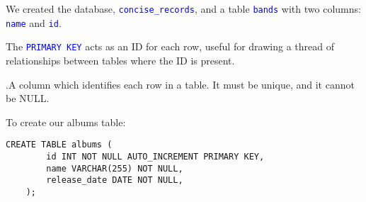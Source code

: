 \vspace{1em}
\noindent
We created the database, \textcolor{blue}{\texttt{concise\_records}}, and a table \textcolor{blue}{\texttt{bands}}
with two columns: \textcolor{blue}{\texttt{name}} and \textcolor{blue}{\texttt{id}}.\\


\newpage

\noindent
The \textcolor{blue}{\texttt{PRIMARY KEY}} acts as an ID for each row, useful for
drawing a thread of relationships between tables where the ID is present.\\

\begin{Def}
    .A column which identifies each row in a table. It must be unique, and it cannot be NULL.
\end{Def}

\noindent
To create our albums table:

\begin{lstlisting}[style=sql]
    CREATE TABLE albums (
        id INT NOT NULL AUTO_INCREMENT PRIMARY KEY,
        name VARCHAR(255) NOT NULL,
        release_date DATE NOT NULL,
    );

\end{lstlisting}



